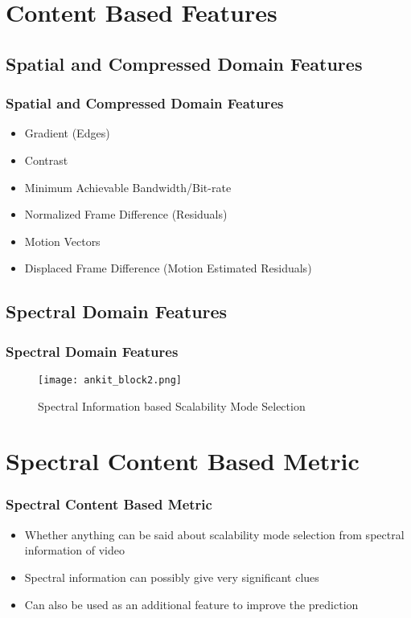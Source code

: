 \documentclass{beamer}
\begin{document}
\section{Content Based Features}
\subsection{Spatial and Compressed Domain Features}
\begin{frame}\frametitle{Spatial and Compressed Domain Features}
\begin{itemize}
\setlength\itemsep{1 em}
\item Gradient (Edges)
\item Contrast
\item Minimum Achievable Bandwidth/Bit-rate
\item Normalized Frame Difference (Residuals)
\item Motion Vectors
\item Displaced Frame Difference (Motion Estimated Residuals)
\end{itemize}
\end{frame}

\subsection{Spectral Domain Features}
\begin{frame}\frametitle{Spectral Domain Features}
\begin{figure}
\centering
\texttt{[image: ankit\_block2.png]}
\caption{Spectral Information based Scalability Mode Selection }
\label{ankit_block}
\end{figure}
\end{frame}


\section{Spectral Content Based Metric}
\begin{frame}\frametitle{Spectral Content Based Metric}
\begin{itemize}
\setlength\itemsep{1.5 em}
\item Whether anything can be said about scalability mode selection from spectral information of video
\item Spectral information can possibly give very significant clues
\item Can also be used as an additional feature to improve the prediction
\end{itemize}
\end{frame}
\end{document}
